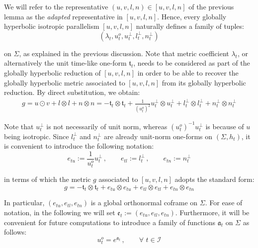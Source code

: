 \documentclass[10pt,reqno,a4paper]{amsart}
\theoremstyle{plain}
\theoremstyle{definition}
\theoremstyle{remark}
\theoremstyle{remark}
\newcommand{\frt}{\mathfrak{t}}
\def\cI{\mathcal{I}}
\def\fra{\mathfrak{a}}
\def\fre{\mathfrak{e}}
\renewcommand{\(}{ (}
\renewcommand{\)}{ )}
\begin{document}
\noindent
We will refer to the representative $(u,v,l,n)\in [u,v,l,n]$ of the previous lemma as the \emph{adapted} representative in $[u,v,l,n]$. Hence, every globally hyperbolic isotropic parallelism $[u,v,l,n]$ naturally defines a family of tuples:
\begin{equation*}
(\lambda_t , u^o_t , u^{\perp}_t , l^{\perp}_t , n^{\perp}_t ) 
\end{equation*}

\noindent
on $\Sigma$, as explained in the previous discussion. Note that metric coefficient $\lambda_t$, or alternatively the unit time-like one-form $\frt_t$, needs to be considered as part of the globally hyperbolic reduction of $[u,v,l,n]$ in order to be able to recover the globally hyperbolic metric associated to $[u,v,l,n]$ from its globally hyperbolic reduction. By direct substitution, we obtain:
\begin{eqnarray*}
g = u\odot v + l \otimes l + n\otimes n = -\frt_t\otimes \frt_t + \frac{1}{(u^o_t)^2} u^{\perp}_t \otimes  u^{\perp}_t +  l^{\perp}_t\otimes  l^{\perp}_t +  n^{\perp}_t\otimes  n^{\perp}_t
\end{eqnarray*}

\noindent
Note that $u^{\perp}_{t}$ is not necessarily of unit norm, whereas $(u^o_t)^{-1} u^{\perp}_{t}$ is because of $u$ being isotropic. Since $l^{\perp}_t$ and $n^{\perp}_t$ are already unit-norm one-forms on $(\Sigma,h_t)$, it is convenient to introduce the following notation:
\begin{equation*}
e_{tu} := \frac{1}{u^o_t} u^{\perp}_{t} \, , \qquad e_{tl}:= l^{\perp}_{t} \, , \qquad e_{tn} := n^{\perp}_{t} 
\end{equation*} 


\noindent
in terms of which the metric $g$ associated to $[u,v,l,n]$ adopts the standard form:
\begin{equation*}
g =  -\frt_t\otimes \frt_t + e_{tu} \otimes  e_{tu} + e_{tl} \otimes  e_{tl} + e_{tn} \otimes  e_{tn}
\end{equation*}

\noindent
In particular, $(e_{tu},e_{tl},e_{tn})$ is a global orthonormal coframe on $\Sigma$. For ease of notation, in the following we will set $\fre_t := (e_{tu},e_{tl},e_{tn})$. Furthermore, it will be convenient for future computations to introduce a family of functions $\fra_t$ on $\Sigma$ as follows:
\begin{equation*}
u_t^o = e^{\fra_t}\, , \qquad \forall\,\, t\in \cI
\end{equation*}
\end{document}
